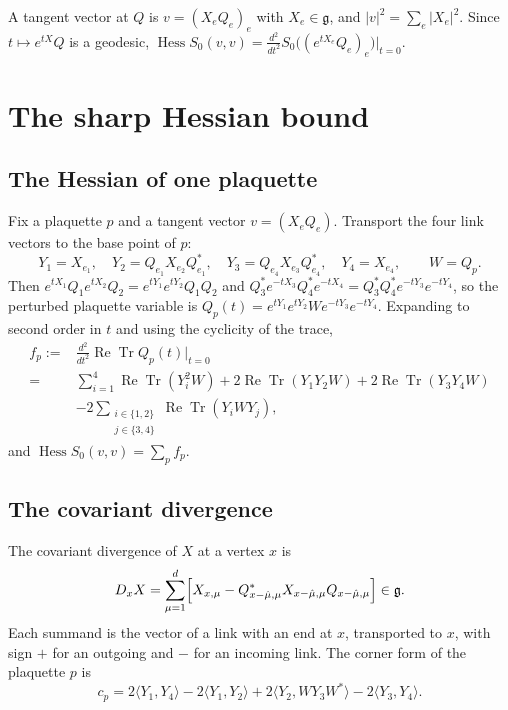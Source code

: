 \documentclass[11pt]{amsart}
\theoremstyle{definition}
\theoremstyle{remark}
\newcommand{\g}{\mathfrak{g}}
\newcommand{\ReTr}{\operatorname{Re}\operatorname{Tr}}
\newcommand{\Hess}{\operatorname{Hess}}
\newcommand{\ip}[2]{\langle #1,#2\rangle}
\begin{document}
A tangent vector at $Q$ is $v=(X_eQ_e)_e$ with $X_e\in\g$, and
$|v|^2=\sum_e|X_e|^2$. Since $t\mapsto e^{tX}Q$ is a geodesic,
$\Hess S_0(v,v)=\frac{d^2}{dt^2}S_0\bigl((e^{tX_e}Q_e)_e\bigr)|_{t=0}$.

\section{The sharp Hessian bound}\label{sec:hessian}

\subsection{The Hessian of one plaquette}

Fix a plaquette $p$ and a tangent vector $v=(X_eQ_e)$. Transport the four
link vectors to the base point of $p$:
\begin{equation}\label{eq:transport}
Y_1=X_{e_1},\quad Y_2=Q_{e_1}X_{e_2}Q_{e_1}^*,\quad
Y_3=Q_{e_4}X_{e_3}Q_{e_4}^*,\quad Y_4=X_{e_4},\qquad W=Q_p.
\end{equation}
Then $e^{tX_1}Q_1e^{tX_2}Q_2=e^{tY_1}e^{tY_2}Q_1Q_2$ and
$Q_3^*e^{-tX_3}Q_4^*e^{-tX_4}=Q_3^*Q_4^*e^{-tY_3}e^{-tY_4}$, so the perturbed
plaquette variable is $Q_p(t)=e^{tY_1}e^{tY_2}We^{-tY_3}e^{-tY_4}$. Expanding to
second order in $t$ and using the cyclicity of the trace,
\begin{equation}\label{eq:fp}
\begin{split}
f_p:={}&\frac{d^2}{dt^2}\ReTr Q_p(t)\Big|_{t=0}\\
={}&\sum_{i=1}^4\ReTr(Y_i^2W)+2\ReTr(Y_1Y_2W)+2\ReTr(Y_3Y_4W)\\
&-2\!\!\sum_{\substack{i\in\{1,2\}\\ j\in\{3,4\}}}\!\!\ReTr(Y_iWY_j),
\end{split}
\end{equation}
and $\Hess S_0(v,v)=\sum_pf_p$.

\subsection{The covariant divergence}

The covariant divergence of $X$ at a vertex $x$ is
\begin{equation}\label{eq:divergence}
D_xX=\sum_{\mu=1}^d\Bigl[X_{x,\mu}-Q_{x-\hat\mu,\mu}^*X_{x-\hat\mu,\mu}
Q_{x-\hat\mu,\mu}\Bigr]\in\g .
\end{equation}
Each summand is the vector of a link with an end at $x$, transported to $x$,
with sign $+$ for an outgoing and $-$ for an incoming link. The corner form of
the plaquette $p$ is
\begin{equation}\label{eq:corner}
c_p=2\ip{Y_1}{Y_4}-2\ip{Y_1}{Y_2}+2\ip{Y_2}{WY_3W^*}-2\ip{Y_3}{Y_4}.
\end{equation}
\end{document}
